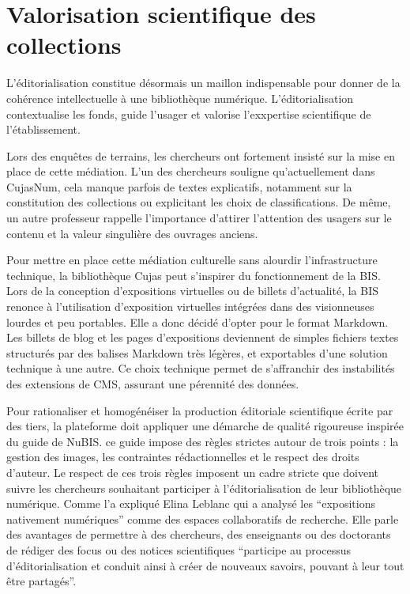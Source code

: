 \section{Valorisation scientifique des collections}
L'éditorialisation constitue désormais un maillon indispensable pour donner de la cohérence intellectuelle à une bibliothèque numérique. L'éditorialisation contextualise les fonds, guide l'usager et valorise l'exxpertise scientifique de l'établissement.

Lors des enquêtes de terrains, les chercheurs ont fortement insisté sur la mise en place de cette médiation. L'un des chercheurs souligne qu'actuellement dans CujasNum, cela manque parfois de textes explicatifs, notamment sur la constitution des collections ou explicitant les choix de classifications. De même, un autre professeur rappelle l'importance d'attirer l'attention des usagers sur le contenu et la valeur singulière des ouvrages anciens.

Pour mettre en place cette médiation culturelle sans alourdir l'infrastructure technique, la bibliothèque Cujas peut s'inspirer du fonctionnement de la BIS. Lors de la conception d'expositions virtuelles ou de billets d'actualité, la BIS renonce à l'utilisation d'exposition virtuelles intégrées dans des visionneuses lourdes et peu portables. Elle a donc décidé d'opter pour le format Markdown. Les billets de blog et les pages d'expositions deviennent de simples fichiers textes structurés par des balises Markdown très légères, et exportables d'une solution technique à une autre. Ce choix technique permet de s'affranchir des instabilités des extensions de CMS, assurant une pérennité des données.

Pour rationaliser et homogénéiser la production éditoriale scientifique écrite par des tiers, la plateforme doit appliquer une démarche de qualité rigoureuse inspirée du guide de NuBIS. ce guide impose des règles strictes autour de trois points : la gestion des images, les contraintes rédactionnelles et le respect des droits d'auteur. Le respect de ces trois règles imposent un cadre stricte que doivent suivre les chercheurs souhaitant participer à l'éditorialisation de leur bibliothèque numérique. Comme l'a expliqué Elina Leblanc qui a analysé les \enquote{expositions nativement numériques} comme des espaces collaboratifs de recherche. Elle parle des avantages de permettre à des chercheurs, des enseignants ou des doctorants de rédiger des focus ou des notices scientifiques \enquote{participe au processus d'éditorialisation et conduit ainsi à créer de nouveaux savoirs, pouvant à leur tout être partagés}.

